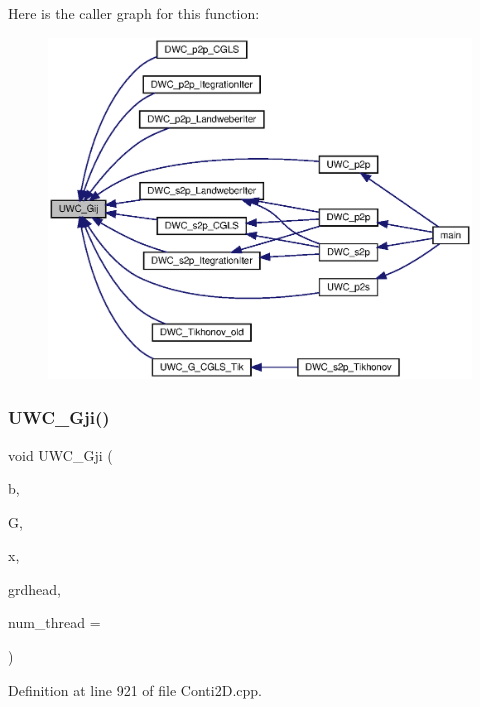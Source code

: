 Here is the caller graph for this function\+:\nopagebreak
\begin{figure}[H]
\begin{center}
\leavevmode
\includegraphics[width=350pt]{Conti2D_8h_a234334c62ff3fa43eb0da53c34983b69_a234334c62ff3fa43eb0da53c34983b69_icgraph}
\end{center}
\end{figure}
\mbox{\label{Conti2D_8h_a8605c53ff46885c04166a7f598084aa4_a8605c53ff46885c04166a7f598084aa4}} 
\subsubsection{U\+W\+C\+\_\+\+Gji()\hspace{0.1cm}{\footnotesize\ttfamily [1/2]}}
{\footnotesize\ttfamily void U\+W\+C\+\_\+\+Gji (\begin{DoxyParamCaption}\item[{double $\ast$}]{b,  }\item[{double $\ast$}]{G,  }\item[{double $\ast$}]{x,  }\item[{\textbf{ Grd\+Head}}]{grdhead,  }\item[{int}]{num\+\_\+thread = {} }\end{DoxyParamCaption})}



Definition at line 921 of file Conti2\+D.\+cpp.




